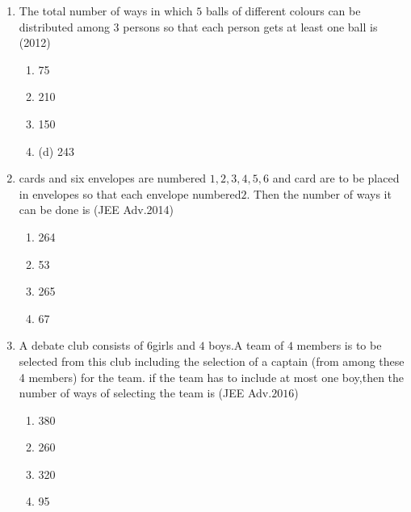 \documentclass[journal,12pt,twocolumn]{IEEEtran}
\theoremstyle{remark}
\begin{document}
\begin{enumerate}[start=3]
\hfill{($2009$)}\\
\begin{multicols}{2} 
\begin{enumerate}
\item 55\item 77\columnbreak\item  66\item 88
\end{enumerate}
\end{multicols}
\item The total number of ways in which $5$ balls of different colours can be distributed among $3$ persons so that each person gets at least one ball is
\hfill{(2012)}\\
\begin{multicols}{2} 
\begin{enumerate}
\item  75\item 210\columnbreak\item150\item (d) 243
\end{enumerate}
\end{multicols}
\item cards and six envelopes are numbered $1,2,3,4,5,6$ and card are to be placed in envelopes so that each envelope numbered$2$. Then the number of ways it can be done is
\hspace*{\fill}(JEE Adv.2014)\\
\begin{multicols}{2} 
\begin{enumerate}
\item  264\item53 \columnbreak \item 265\item  67
\end{enumerate}
\end{multicols}
\item A debate club consists of $6 $girls and $4$ boys.A team of $4$ members is to be selected from this club including the selection of a captain (from among these 4 members) for the team. if the team has to include at most one boy,then the number of ways of selecting the team is
\hfill{(JEE Adv.$2016$)}\\
\begin{multicols}{2} 
\begin{enumerate}
\item  380\item 260\columnbreak\item 320\item  95
\end{enumerate}
\end{multicols}

\end{enumerate}
\end{document}
